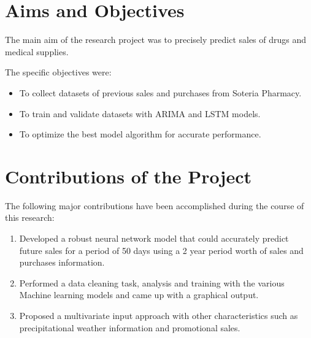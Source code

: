 \documentclass[12pt]{report}
\begin{document}
\section{Aims and Objectives}

The main aim of the research project was to precisely predict sales of drugs and medical supplies.

The specific objectives  were:

\begin{itemize}[topsep=0pt]

\item To collect datasets of previous sales and purchases from Soteria Pharmacy.

\item To train and validate datasets with ARIMA and LSTM models.

\item To optimize the best model algorithm for accurate performance.

\end{itemize}













\section{Contributions of the Project}

The following major contributions have been accomplished during the course of this research:

\begin{enumerate}[topsep=0pt]

\item Developed a robust neural network model that could accurately predict future sales for a period of 50 days using a 2 year period worth of sales and purchases information.

\item Performed a data cleaning task, analysis and training with the various Machine learning models and came up with a graphical output.

\item Proposed a multivariate input approach with other characteristics such as precipitational weather information and promotional sales.

\end{enumerate}
\end{document}
